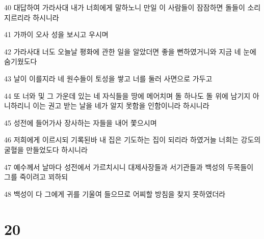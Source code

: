 \par 40 대답하여 가라사대 내가 너희에게 말하노니 만일 이 사람들이 잠잠하면 돌들이 소리지르리라 하시니라
\par 41 가까이 오사 성을 보시고 우시며
\par 42 가라사대 너도 오늘날 평화에 관한 일을 알았더면 좋을 뻔하였거니와 지금 네 눈에 숨기웠도다
\par 43 날이 이를지라 네 원수들이 토성을 쌓고 너를 둘러 사면으로 가두고
\par 44 또 너와 및 그 가운데 있는 네 자식들을 땅에 메어치며 돌 하나도 돌 위에 남기지 아니하리니 이는 권고 받는 날을 네가 알지 못함을 인함이니라 하시니라
\par 45 성전에 들어가사 장사하는 자들을 내어 쫓으시며
\par 46 저희에게 이르시되 기록된바 내 집은 기도하는 집이 되리라 하였거늘 너희는 강도의 굴혈을 만들었도다 하시니라
\par 47 예수께서 날마다 성전에서 가르치시니 대제사장들과 서기관들과 백성의 두목들이 그를 죽이려고 꾀하되
\par 48 백성이 다 그에게 귀를 기울여 들으므로 어찌할 방침을 찾지 못하였더라

\chapter{20}

